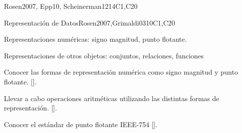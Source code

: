 \begin{syllabus}
\begin{unit}{\DSProofTechniques}{}{Rosen2007, Epp10, Scheinerman12}{14}{C1,C20}
\begin{learningoutcomes}
	\item \DSProofTechniquesLOIdentifyTheUsed [\Assessment]
	\item \DSProofTechniquesLOOutline [\Usage ]
	\item \DSProofTechniquesLOApplyEach [\Usage ]
	\item \DSProofTechniquesLODetermineWhich [\Assessment]
	\item \DSProofTechniquesLOExplainTheIdeas [\Familiarity ]
	\item \DSProofTechniquesLOExplainTheWeak [\Assessment]
	\item \DSProofTechniquesLOStateThe [\Familiarity]
\end{learningoutcomes}
\end{unit}

\begin{unit}{Representación de Datos}{}{Rosen2007,Grimaldi03}{10}{C1,C20}
\begin{topics}
    \item Representaciones numéricas: signo magnitud, punto flotante.
    \item Representaciones de otros objetos: conjuntos, relaciones, funciones
\end{topics}

\begin{learningoutcomes}
    \item Conocer las formas de representación numérica como signo magnitud y punto flotante. [\Assessment].
    \item Llevar a cabo operaciones aritméticas utilizando las distintas formas de representación. [\Assessment].
    \item Conocer el estándar de punto flotante IEEE-754 [\Familiarity].
\end{learningoutcomes}
 \end{unit}

\begin{coursebibliography}
\end{coursebibliography}

\end{syllabus}

%
